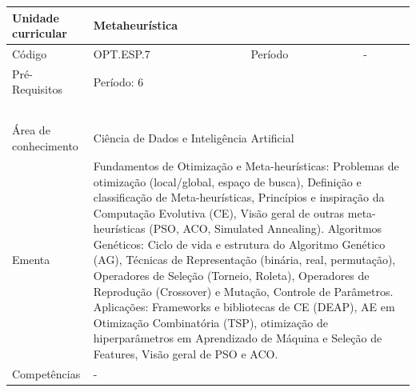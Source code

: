 \clearpage
\newpage

\begin{quadro}[ht!]
  \centering\scriptsize
\caption{Unidade Curricular Metaheurística}

\begin{tabular}{|p{2.5cm}|p{2.5cm}|p{2.5cm}|p{2.5cm}|p{2.5cm}|}\hline

  Unidade curricular & \multicolumn{4}{p{10cm}|}{ Metaheurística }\\\hline
  Código & OPT.ESP.7 & Período & \multicolumn{2}{p{5cm}|}{ - }\\\hline
  Pré-Requisitos & \multicolumn{4}{p{10cm}|}{ Período: 6 } \\\hline
  \cellcolor{blue1}{ CH PRESENCIAL } &
    \cellcolor{blue1}{CH EAD Síncrona} &
    \cellcolor{blue1}{CH EAD Síncrona Mediada} &
    \cellcolor{blue1}{CH EAD Assíncrona} &
    \cellcolor{blue1}{CH APCC} \\\hline
  \cellcolor{blue1}{ 60 } &
    \cellcolor{blue1}{ 0 } &
    \cellcolor{blue1}{ 30 } &
    \cellcolor{blue1}{ 30 } &
    \cellcolor{blue1}{0} \\\hline
  \cellcolor{blue1}{ CH Teórica } &
    \cellcolor{blue1}{CH Prática} &
    \cellcolor{blue1}{CH Humanidades} &
    \cellcolor{blue1}{CH Extensão} &
    \cellcolor{blue1}{CH EAD TOTAL} \\\hline
  \cellcolor{blue1}{ 30 } &
    \cellcolor{blue1}{ 30 } &
    \cellcolor{blue1}{ 0 } &
    \cellcolor{blue1}{ 0 } &
    \cellcolor{blue1}{ 60 } \\\hline
  \cellcolor{blue1}{CARGA-HORÁRIA TOTAL} & \multicolumn{4}{p{10cm}|}{ \cellcolor{blue1}{ 60 } } \\\hline
  Área de conhecimento & \multicolumn{4}{p{10cm}|}{ Ciência de Dados e Inteligência Artificial } \\\hline
  Ementa & \multicolumn{4}{p{10cm}|}{ Fundamentos de Otimização e Meta-heurísticas: Problemas de otimização (local/global, espaço de busca), Definição e classificação de Meta-heurísticas, Princípios e inspiração da Computação Evolutiva (CE), Visão geral de outras meta-heurísticas (PSO, ACO, Simulated Annealing). Algoritmos Genéticos: Ciclo de vida e estrutura do Algoritmo Genético (AG), Técnicas de Representação (binária, real, permutação), Operadores de Seleção (Torneio, Roleta), Operadores de Reprodução (Crossover) e Mutação, Controle de Parâmetros. Aplicações: Frameworks e bibliotecas de CE (DEAP), AE em Otimização Combinatória (TSP), otimização de hiperparâmetros em Aprendizado de Máquina e Seleção de Features, Visão geral de PSO e ACO. } \\\hline
  Competências & \multicolumn{4}{p{10cm}|}{ - } \\\hline


  
	\end{tabular}

\end{quadro}


